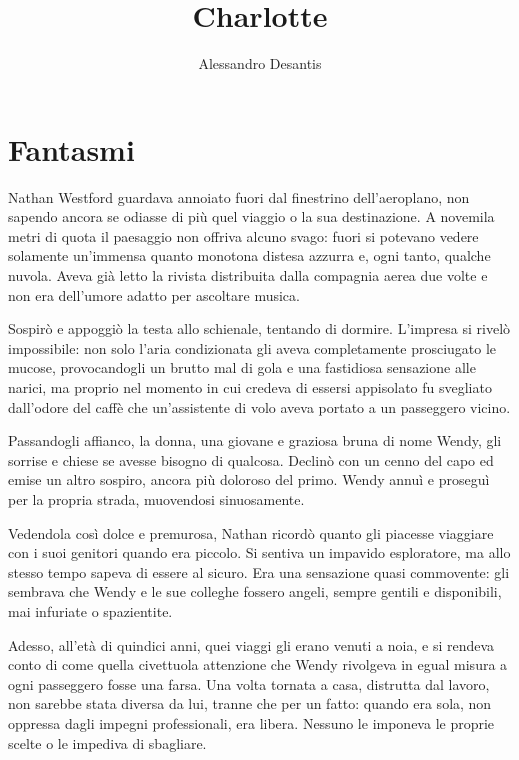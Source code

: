 \documentclass[a4paper,oneside,11pt]{memoir}
\title{Charlotte}
\author{Alessandro Desantis}
\date{}
\begin{document}
\begin{titlingpage}
\maketitle
\end{titlingpage}

\chapter{Fantasmi}

Nathan Westford guardava annoiato fuori dal finestrino dell'aeroplano, non
sapendo ancora se odiasse di più quel viaggio o la sua destinazione. A novemila
metri di quota il paesaggio non offriva alcuno svago: fuori si potevano vedere
solamente un'immensa quanto monotona distesa azzurra e, ogni tanto, qualche
nuvola. Aveva già letto la rivista distribuita dalla compagnia aerea due volte e
non era dell'umore adatto per ascoltare musica.

Sospirò e appoggiò la testa allo schienale, tentando di dormire. L'impresa si
rivelò impossibile: non solo l'aria condizionata gli aveva completamente
prosciugato le mucose, provocandogli un brutto mal di gola e una fastidiosa
sensazione alle narici, ma proprio nel momento in cui credeva di essersi
appisolato fu svegliato dall'odore del caffè che un'assistente di volo aveva
portato a un passeggero vicino.

Passandogli affianco, la donna, una giovane e graziosa bruna di nome Wendy, gli
sorrise e chiese se avesse bisogno di qualcosa. Declinò con un cenno del capo ed
emise un altro sospiro, ancora più doloroso del primo. Wendy annuì e proseguì
per la propria strada, muovendosi sinuosamente.

Vedendola così dolce e premurosa, Nathan ricordò quanto gli piacesse viaggiare
con i suoi genitori quando era piccolo. Si sentiva un impavido esploratore, ma
allo stesso tempo sapeva di essere al sicuro. Era una sensazione quasi
commovente: gli sembrava che Wendy e le sue colleghe fossero angeli, sempre
gentili e disponibili, mai infuriate o spazientite.

Adesso, all'età di quindici anni, quei viaggi gli erano venuti a noia, e si
rendeva conto di come quella civettuola attenzione che Wendy rivolgeva in egual
misura a ogni passeggero fosse una farsa. Una volta tornata a casa, distrutta
dal lavoro, non sarebbe stata diversa da lui, tranne che per un fatto: quando
era sola, non oppressa dagli impegni professionali, era libera. Nessuno le
imponeva le proprie scelte o le impediva di sbagliare.
\end{document}
